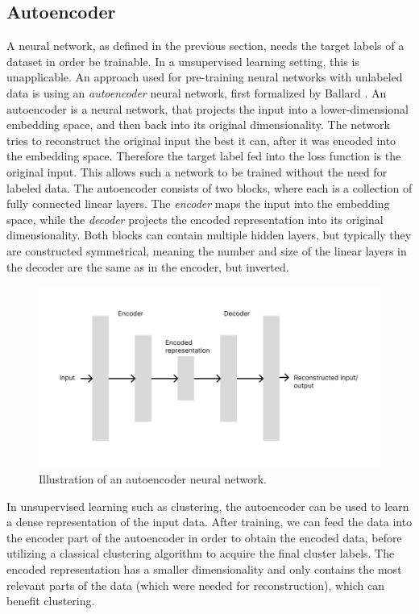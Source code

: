 \subsection{Autoencoder}

A neural network, as defined in the previous section, needs the target labels of a dataset in order be trainable. In a unsupervised learning setting, this is unapplicable. An approach used for pre-training neural networks with unlabeled data is using an \textit{autoencoder} neural network, first formalized by Ballard \cite{autoencoder}. An autoencoder is a neural network, that projects the input into a lower-dimensional embedding space, and then back into its original dimensionality. The network tries to reconstruct the original input the best it can, after it was encoded into the embedding space. Therefore the target label fed into the loss function is the original input. This allows such a network to be trained without the need for labeled data. The autoencoder consists of two blocks, where each is a collection of fully connected linear layers. The \textit{encoder} maps the input into the embedding space, while the \textit{decoder} projects the encoded representation into its original dimensionality. Both blocks can contain multiple hidden layers, but typically they are constructed symmetrical, meaning the number and size of the linear layers in the decoder are the same as in the encoder, but inverted. 

\begin{figure}
	\includegraphics[width=1.1\linewidth]{autoencoder.png}
	\caption{Illustration of an autoencoder neural network.}
	\label{autoencoder}
\end{figure}

In unsupervised learning such as clustering, the autoencoder can be used to learn a dense representation of the input data. After training, we can feed the data into the encoder part of the autoencoder in order to obtain the encoded data, before utilizing a classical clustering algorithm to acquire the final cluster labels. The encoded representation has a smaller dimensionality and only contains the most relevant parts of the data (which were needed for reconstruction), which can benefit clustering.

